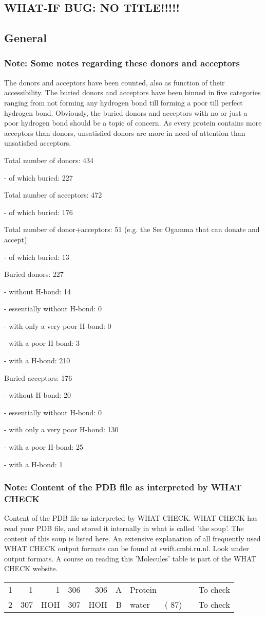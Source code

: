 \documentclass[a4paper]{article}
\def\showsect#1{
  \thesect\gdef\thesect{}
  \thessect\gdef\thessect{}
  \subsubsection{#1}
}
\gdef\thesect{\pagebreak[2]\section{WHAT-IF BUG: NO TITLE!!!!!}}
\gdef\thessect{\subsection{General}}
\begin{document}
\begin{note}
\showsect{Note: Some notes regarding these donors and acceptors}
The donors and acceptors have been counted, also as function of their
accessibility. The buried donors and acceptors have been binned in five
categories ranging from not forming any hydrogen bond till forming a poor
till perfect hydrogen bond. Obviously, the buried donors and acceptors
with no or just a poor hydrogen bond should be a topic of concern. As every
protein contains more acceptors than donors, unsatisfied donors are more in
need of attention than unsatisfied acceptors.
 
\parbox{1\textwidth}{
Total number of donors: 434
 
- of which buried: 227
 
Total number of acceptors: 472
 
- of which buried: 176
 
Total number of donor+acceptors: 51
  (e.g. the Ser Ogamma that can donate and accept)
 
- of which buried: 13
 
Buried donors: 227
 
- without H-bond: 14
 
- essentially without H-bond: 0
 
- with only a very poor H-bond: 0
 
- with a poor H-bond: 3
 
- with a H-bond: 210
 
 
Buried acceptors: 176
 
- without H-bond: 20
 
- essentially without H-bond: 0
 
- with only a very poor H-bond: 130
 
- with a poor H-bond: 25
 
- with a H-bond: 1
 
}%
 
\end{note}

\begin{note}
\showsect{Note: Content of the PDB file as interpreted by WHAT CHECK}
Content of the PDB file as interpreted by WHAT CHECK.
WHAT CHECK has read your PDB file, and stored it internally in what is called
'the soup'. The content of this soup is listed here. An extensive explanation
of all frequently used WHAT CHECK output formats can be found at
swift.cmbi.ru.nl. Look under output formats. A course on reading this
'Molecules' table is part of the WHAT CHECK website.
 
\begin{center}
 
\begin{supertabular}{rr@{ (}r@{) }r@{ (}r@{) }rlrrl}
     1&    1&    1&  306&  306&A&Protein&        &  &To check\\
     2&  307& HOH &  307& HOH &B&water  &(   87) &  &To check\\
\end{supertabular}\end{center}
\end{note}
\end{document}
